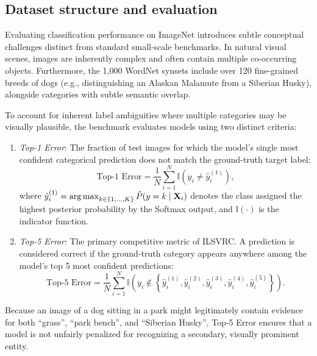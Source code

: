 \subsection{Dataset structure and evaluation}
\label{sec:imagenet_evaluation_metrics}

Evaluating classification performance on ImageNet introduces subtle conceptual challenges distinct from standard small-scale benchmarks. In natural visual scenes, images are inherently complex and often contain multiple co-occurring objects. Furthermore, the 1,000 WordNet synsets include over 120 fine-grained breeds of dogs (e.g., distinguishing an Alaskan Malamute from a Siberian Husky), alongside categories with subtle semantic overlap.

To account for inherent label ambiguities where multiple categories may be visually plausible, the benchmark evaluates models using two distinct criteria:
\begin{enumerate}[leftmargin=*]
  \item \textit{Top-1 Error}: The fraction of test images for which the model's single most confident categorical prediction does not match the ground-truth target label:
    \begin{equation}
    \text{Top-1 Error} = \frac{1}{N} \sum_{i=1}^N \mathbb{I}\left( y_i \ne \hat{y}_i^{(1)} \right),
    \label{eq:top1_error_def}
    \end{equation}
    where $\hat{y}_i^{(1)} = \operatorname*{arg\,max}_{k \in \{1,\dots,K\}} \hat{P}(y = k \mid \mathbf{X}_i)$ denotes the class assigned the highest posterior probability by the Softmax output, and $\mathbb{I}(\cdot)$ is the indicator function.
  \item \textit{Top-5 Error}: The primary competitive metric of ILSVRC. A prediction is considered correct if the ground-truth category appears anywhere among the model's top 5 most confident predictions:
    \begin{equation}
    \text{Top-5 Error} = \frac{1}{N} \sum_{i=1}^N \mathbb{I}\left( y_i \notin \left\{ \hat{y}_i^{(1)}, \hat{y}_i^{(2)}, \hat{y}_i^{(3)}, \hat{y}_i^{(4)}, \hat{y}_i^{(5)} \right\} \right).
    \label{eq:top5_error_def}
    \end{equation}
\end{enumerate}
Because an image of a dog sitting in a park might legitimately contain evidence for both ``grass'', ``park bench'', and ``Siberian Husky'', Top-5 Error ensures that a model is not unfairly penalized for recognizing a secondary, visually prominent entity.

